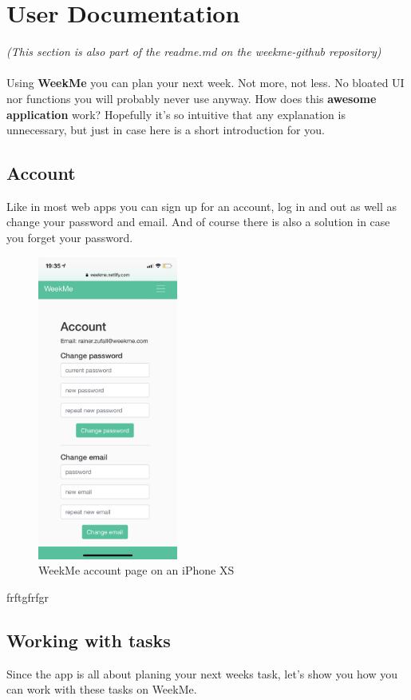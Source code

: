 \section{User Documentation}
\textit{(This section is also part of the readme.md on the weekme-github repository)} \\
\\Using \textbf{WeekMe} you can plan your next week. Not more, not less. No bloated UI nor functions you will probably never use anyway. 
How does this \textbf{awesome application} work? Hopefully it's so intuitive that any explanation is unnecessary, but just in case here is a short introduction for you.

\subsection{Account}
Like in most web apps you can sign up for an account, log in and out as well as change your password and email. And of course there is also a solution in case you forget your password. 
\begin{figure}[H] 
	\centering 
	\includegraphics[height=10cm]{figures/user_docu_accounts_page.PNG}   
	\caption[WeekMe account page]{WeekMe account page on an iPhone XS}       
	\label{fig: Setting an environment variable in Heroku}     
\end{figure}  
frftgfrfgr
\subsection{Working with tasks}
Since the app is all about planing your next weeks task, let's show you how you can work with these tasks on WeekMe. 
